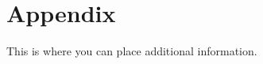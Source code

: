 \documentclass[12pt, titlepage]{article}
\begin{document}
\begin{comment}
\subsubsection{Module ?}
		
\begin{enumerate}

\item{test-id1\\}

Type: \wss{Functional, Dynamic, Manual, Automatic, Static etc. Most will
  be automatic}
					
Initial State: 
					
Input/Condition: 
					
Output/Result: 
					
How test will be performed: 
					
\item{test-id2\\}

Type: Functional, Dynamic, Manual, Static etc.
					
Initial State: 
					
Input: 
					
Output: 
					
How test will be performed: 

\end{enumerate}

\subsubsection{Module ?}

...

\subsection{Traceability Between Test Cases and Modules}

\wss{Provide evidence that all of the modules have been considered.}
\end{comment}





\newpage

\section{Appendix}

This is where you can place additional information.
\end{document}
